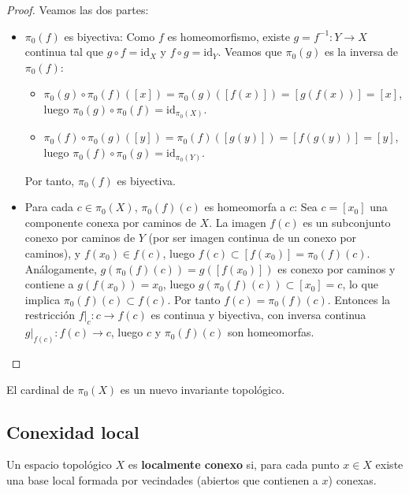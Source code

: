 \begin{proof}
    Veamos las dos partes:
    \begin{itemize}
        \item $\pi_0(f)$ es biyectiva: Como $f$ es homeomorfismo, existe $g = f^{-1} \colon Y \to X$ continua tal que $g \circ f = \mathrm{id}_X$ y $f \circ g = \mathrm{id}_Y$. Veamos que $\pi_0(g)$ es la inversa de $\pi_0(f)$:
        \begin{itemize}
            \item $\pi_0(g) \circ \pi_0(f)([x]) = \pi_0(g)([f(x)]) = [g(f(x))] = [x]$, luego $\pi_0(g) \circ \pi_0(f) = \mathrm{id}_{\pi_0(X)}$.
            \item $\pi_0(f) \circ \pi_0(g)([y]) = \pi_0(f)([g(y)]) = [f(g(y))] = [y]$, luego $\pi_0(f) \circ \pi_0(g) = \mathrm{id}_{\pi_0(Y)}$.
        \end{itemize}
        Por tanto, $\pi_0(f)$ es biyectiva.
        \item Para cada $c \in \pi_0(X)$, $\pi_0(f)(c)$ es homeomorfa a $c$: Sea $c = [x_0]$ una componente conexa por caminos de $X$. La imagen $f(c)$ es un subconjunto conexo por caminos de $Y$ (por ser imagen continua de un conexo por caminos), y $f(x_0) \in f(c)$, luego $f(c) \subset [f(x_0)] = \pi_0(f)(c)$. Análogamente, $g(\pi_0(f)(c)) = g([f(x_0)])$ es conexo por caminos y contiene a $g(f(x_0)) = x_0$, luego $g(\pi_0(f)(c)) \subset [x_0] = c$, lo que implica $\pi_0(f)(c) \subset f(c)$. Por tanto $f(c) = \pi_0(f)(c)$. Entonces la restricción $f|_c \colon c \to f(c)$ es continua y biyectiva, con inversa continua $g|_{f(c)} \colon f(c) \to c$, luego $c$ y $\pi_0(f)(c)$ son homeomorfas.
    \end{itemize}
\end{proof}
\begin{observación}
    El cardinal de $\pi_0(X)$ es un nuevo invariante topológico.
\end{observación}

\subsection{Conexidad local}
\begin{definición}
    Un espacio topológico $X$ es \textbf{localmente conexo} si, para cada punto $x \in X$ existe una base local formada por vecindades (abiertos que contienen a $x$) conexas.
\end{definición}

